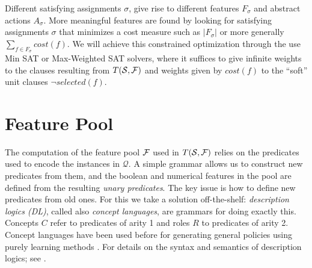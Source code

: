 \documentclass[letterpaper]{article} %
\newcommand{\Omit}[1]{}
\newtheorem{theorem}[definition]{Theorem}
\newcommand{\Q}{\mathcal{Q}}
\begin{document}
\Omit{
The goal expression $G_F$ can be provided explicitly  in terms of the primitive predicates,
but  more generally can be extracted  from the satisfying assigment $\sigma$ as well.
For this, $G_F = G_{\sigma}$ is defined as the DNF formula whose terms 
correspond to the abstract states over the selected features in $F_{\sigma}$ 
that are false in all expanded states in ${\cal S}$ marked as non-goals
and true in some expanded goal state. This DNF formula can   be simplified in standard ways. 
Due to  (\ref{d1}) and (\ref{goal}) that force the selected features in $F_{\sigma}$
to   distinguish goal  from non-goal states, we have that:

\begin{theorem}
For a satisfying assigment $\sigma$  of $T({\cal S},{\cal F})$, 
$s$ is expanded goal   state in ${\cal S}$  iff  $s$ satisfies  $G_F=G_{\sigma}$.
\end{theorem}
}


Different  satisfying  assignments $\sigma$,  give rise to different  features $F_{\sigma}$
and abstract actions $A_{\sigma}$. More meaningful features are found by looking for
satisfying assignments $\sigma$  that minimizes a cost measure such as $|F_{\sigma}|$
or  more generally $\sum_{f \in F_{\sigma}} cost(f)$. We will  achieve this  constrained
optimization through the use  Min SAT or Max-Weighted SAT solvers,  where it suffices to give
infinite weights  to the clauses resulting from $T({\cal S},{\cal F})$ and weights given by $cost(f)$ 
to the ``soft''  unit clauses  $\neg selected(f)$.

\section{Feature Pool}

The computation of the feature pool $\cal F$ used in $T({\cal S},{\cal F})$
relies on the predicates used to encode the instances in $\Q$.
A simple grammar allows  us   to construct new predicates from them, 
and the boolean and numerical features in the pool
are defined from the resulting \emph{unary predicates}. 
The key issue is how to define new predicates from old  ones. For this 
we take a solution off-the-shelf: \emph{description logics (DL)},  called  also
\emph{concept languages},  are grammars for doing exactly this.
Concepts $C$  refer  to predicates of arity 1 and roles $R$  to predicates of arity 2.
Concept languages have been used before for  generating general policies using purely learning methods  \cite{martin:concept,fern:bias}.
For details on the syntax and semantics of description logics; see \cite{dl-handbook}.
\end{document}
